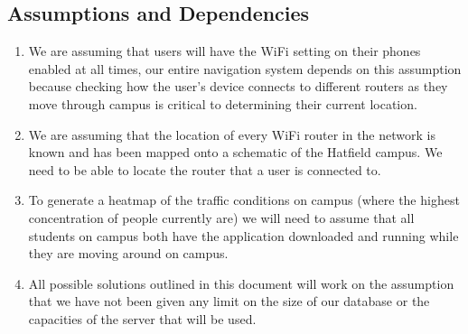 \documentclass[a4paper,12pt]{article}
\begin{document}
	\subsection{Assumptions and Dependencies}
		\begin{enumerate}
			\item We are assuming that users will have the WiFi setting on their phones enabled at all times, our entire navigation system depends on this assumption because checking how the user's device connects to different routers as they move through campus is critical to determining their current location. 
			\item We are assuming that the location of every WiFi router in the network is known and has been mapped onto a schematic of the Hatfield campus. We need to be able to locate the router that a user is connected to.
			\item To generate a heatmap of the traffic conditions on campus (where the highest concentration of people currently are) we will need to assume that all students on campus both have the application downloaded and running while they are moving around on campus.
			\item All possible solutions outlined in this document will work on the assumption that we have not been given any limit on the size of our database or the capacities of the server that will be used.
		\end{enumerate}
\end{document}
